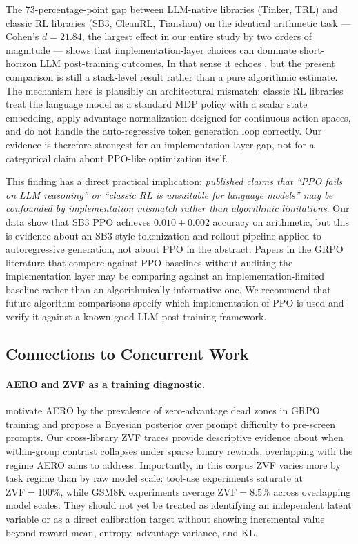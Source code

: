 \documentclass{article}
\begin{document}
The 73-percentage-point gap between LLM-native libraries (Tinker, TRL) and
classic RL libraries (SB3, CleanRL, Tianshou) on the identical arithmetic task
--- Cohen's $d = 21.84$, the largest effect in our entire study by two orders
of magnitude --- shows that implementation-layer choices can dominate
short-horizon LLM post-training outcomes. In that sense it echoes
\citet{henderson2018deep}, but the present comparison is still a stack-level
result rather than a pure algorithmic estimate.
The mechanism here is plausibly an architectural mismatch: classic RL
libraries treat the language model as a standard MDP policy with a scalar
state embedding, apply advantage normalization designed for continuous action
spaces, and do not handle the auto-regressive token generation loop
correctly. Our evidence is therefore strongest for an implementation-layer gap,
not for a categorical claim about PPO-like optimization itself.

This finding has a direct practical implication: \emph{published claims that
``PPO fails on LLM reasoning'' or ``classic RL is unsuitable for language
models'' may be confounded by implementation mismatch rather than algorithmic
limitations}. Our data show that SB3 PPO achieves $0.010 \pm 0.002$ accuracy
on arithmetic, but this is evidence about an SB3-style tokenization and rollout
pipeline applied to autoregressive generation, not about PPO in the abstract.
Papers in the GRPO literature that compare against PPO baselines without
auditing the implementation layer may be comparing against an
implementation-limited baseline rather than an algorithmically informative one.
We recommend that future algorithm comparisons specify which implementation of
PPO is used and verify it against a known-good LLM post-training framework.

\subsection{Connections to Concurrent Work}
\label{sec:discuss_related}

\paragraph{AERO and ZVF as a training diagnostic.}
\citet{zhang2026aero} motivate AERO by the prevalence of zero-advantage dead
zones in GRPO training and propose a Bayesian posterior over prompt difficulty
to pre-screen prompts.
Our cross-library ZVF traces provide descriptive evidence about when
within-group contrast collapses under sparse binary rewards, overlapping with
the regime AERO aims to address.
Importantly, in this corpus ZVF varies more by task regime than by raw model
scale: tool-use experiments saturate at $\text{ZVF} = 100\%$, while GSM8K
experiments average $\text{ZVF} = 8.5\%$ across overlapping model scales.
They should not yet be treated as identifying an independent latent variable
or as a direct calibration target without showing incremental value beyond
reward mean, entropy, advantage variance, and KL.
\end{document}
